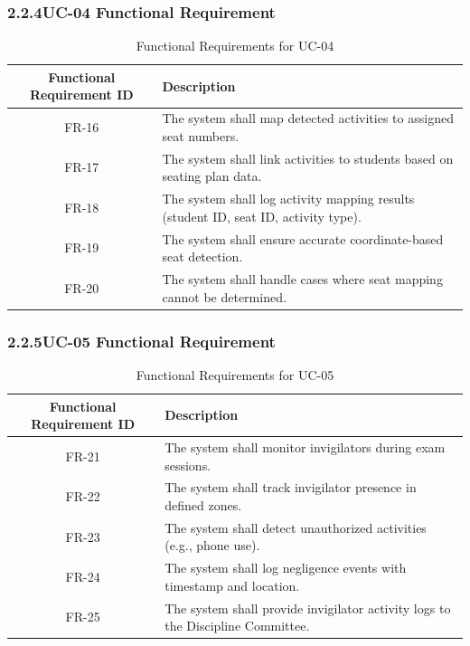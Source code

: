 \subsubsection*{2.2.4\quad UC-04 Functional Requirement}
\vspace{-0.5em}
\begin{table}[H]
\caption{Functional Requirements for UC-04}
\centering
\begin{tabular}{|c|p{11cm}|}
\hline
\textbf{Functional Requirement ID} & \textbf{Description} \\ \hline
FR-16 & The system shall map detected activities to assigned seat numbers. \\ \hline
FR-17 & The system shall link activities to students based on seating plan data. \\ \hline
FR-18 & The system shall log activity mapping results (student ID, seat ID, activity type). \\ \hline
FR-19 & The system shall ensure accurate coordinate-based seat detection. \\ \hline
FR-20 & The system shall handle cases where seat mapping cannot be determined. \\ \hline
\end{tabular}
\end{table}

\subsubsection*{2.2.5\quad UC-05 Functional Requirement}
\vspace{-0.5em}
\begin{table}[H]
\caption{Functional Requirements for UC-05}
\centering
\begin{tabular}{|c|p{11cm}|}
\hline
\textbf{Functional Requirement ID} & \textbf{Description} \\ \hline
FR-21 & The system shall monitor invigilators during exam sessions. \\ \hline
FR-22 & The system shall track invigilator presence in defined zones. \\ \hline
FR-23 & The system shall detect unauthorized activities (e.g., phone use). \\ \hline
FR-24 & The system shall log negligence events with timestamp and location. \\ \hline
FR-25 & The system shall provide invigilator activity logs to the Discipline Committee. \\ \hline
\end{tabular}
\end{table}

